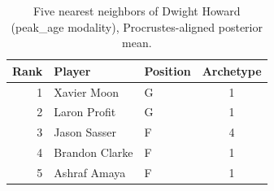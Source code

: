 \begin{table}[htbp]
  \centering\small
  \begin{tabular}{rllc}
    \toprule
    Rank & Player & Position & Archetype \\
    \midrule
    1 & Xavier Moon & G & 1 \\
    2 & Laron Profit & G & 1 \\
    3 & Jason Sasser & F & 4 \\
    4 & Brandon Clarke & F & 1 \\
    5 & Ashraf Amaya & F & 1 \\
    \bottomrule
  \end{tabular}
  \caption{Five nearest neighbors of Dwight Howard (peak_age modality), Procrustes-aligned posterior mean.}
  \label{tab:Dwight_Howard_neighbors_peak_age}
\end{table}

